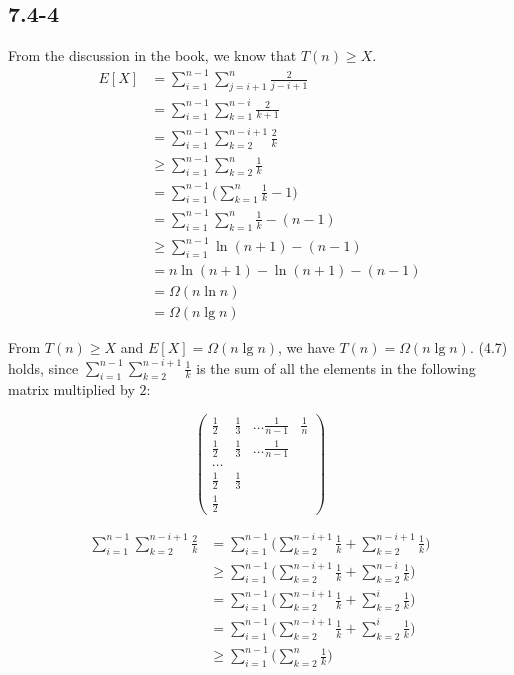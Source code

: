 \documentclass{book}
\begin{document}
\begin{CJK}{UTF8}{gkai}
\subsection*{7.4-4} From the discussion in the book, we know that $T(n) \ge X$.
\begin{align}
E[X] & = \sum_{i=1}^{n-1}\sum_{j=i+1}^{n}\frac{2}{j-i+1} \\
& = \sum_{i=1}^{n-1}\sum_{k=1}^{n-i}\frac{2}{k+1} \\
& = \sum_{i=1}^{n-1}\sum_{k=2}^{n-i+1}\frac{2}{k} \\
& \ge \sum_{i=1}^{n-1}\sum_{k=2}^{n}\frac{1}{k} \\
& = \sum_{i=1}^{n-1}\Big(\sum_{k=1}^{n}\frac{1}{k} - 1\Big) \\
& = \sum_{i=1}^{n-1}\sum_{k=1}^{n}\frac{1}{k} - (n-1) \\
& \ge \sum_{i=1}^{n-1}\ln(n+1) - (n-1) \\
& = n\ln(n+1) - \ln(n+1) - (n-1) \\
& = \Omega(n\ln n) \\
& = \Omega(n\lg n)
\end{align}

From $T(n) \ge X$ and $E[X] = \Omega(n\lg n)$, we have $T(n) = \Omega(n \lg n)$.  
(4.7) holds, since $\sum_{i=1}^{n-1}\sum_{k=2}^{n-i+1}\frac{1}{k}$ is the sum of 
all the elements in the following matrix multiplied by $2$:

\begin{equation*}
\left(
\begin{array}{ccccc}
\frac{1}{2} & \frac{1}{3} & \dots \frac{1}{n-1} & \frac{1}{n} \\
\frac{1}{2} & \frac{1}{3} & \dots \frac{1}{n-1} &  \\
\dots \\
\frac{1}{2} & \frac{1}{3} \\
\frac{1}{2}
\end{array} \right)
\end{equation*}

\begin{align*}
\sum_{i=1}^{n-1}\sum_{k=2}^{n-i+1}\frac{2}{k} & = 
\sum_{i=1}^{n-1}\Big(\sum_{k=2}^{n-i+1}\frac{1}{k} + 
\sum_{k=2}^{n-i+1}\frac{1}{k}\Big) \\
& \ge \sum_{i=1}^{n-1}\Big(\sum_{k=2}^{n-i+1}\frac{1}{k} + 
\sum_{k=2}^{n-i}\frac{1}{k}\Big) \\
& = \sum_{i=1}^{n-1}\Big(\sum_{k=2}^{n-i+1}\frac{1}{k} + 
\sum_{k=2}^{i}\frac{1}{k}\Big) \\
& = \sum_{i=1}^{n-1}\Big(\sum_{k=2}^{n-i+1}\frac{1}{k} + 
\sum_{k=2}^{i}\frac{1}{k}\Big) \\
& \ge \sum_{i=1}^{n-1}\Big(\sum_{k=2}^{n}\frac{1}{k}\Big) \\
\end{align*}


\end{CJK}
\end{document}
